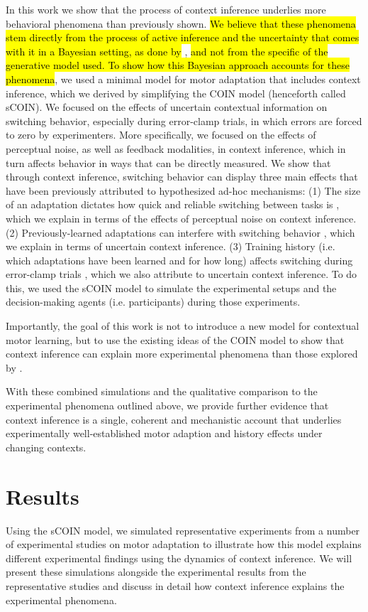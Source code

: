 \documentclass[a4paper,doc,floatsintext,natbib]{apa6}
\DeclareRobustCommand{\newcontent}[1]{\hl{#1}}
\begin{document}
In this work we show that the process of context inference underlies more behavioral phenomena than previously shown. \newcontent{We believe that these phenomena stem directly from the process of active inference and the uncertainty that comes with it in a Bayesian setting, as done by} \cite{Heald_Contextual_2021}, \newcontent{and not from the specific of the generative model used. To show how this Bayesian approach accounts for these phenomena}, we used a minimal model for motor adaptation that includes context inference, which we derived by simplifying the COIN model (henceforth called sCOIN). We focused on the effects of uncertain contextual information on switching behavior, especially during error-clamp trials, in which errors are forced to zero by experimenters. More specifically, we focused on the effects of perceptual noise, as well as feedback modalities, in context inference, which in turn affects behavior in ways that can be directly measured. We show that through context inference, switching behavior can display three main effects that have been previously attributed to hypothesized ad-hoc mechanisms: (1) The size of an adaptation dictates how quick and reliable switching between tasks is \citep{Oh_Minimizing_2019,Kim_Neural_2015}, which we explain in terms of the effects of perceptual noise on context inference. (2) Previously-learned adaptations can interfere with switching behavior \citep{Davidson_Scaling_2004}, which we explain in terms of uncertain context inference. (3) Training history (i.e. which adaptations have been learned and for how long) affects switching during error-clamp trials \citep{Vaswani_Decay_2013}, which we also attribute to uncertain context inference. To do this, we used the sCOIN model to simulate the experimental setups and the decision-making agents (i.e. participants) during those experiments.

Importantly, the goal of this work is not to introduce a new model for contextual motor learning, but to use the existing ideas of the COIN model to show that context inference can explain more experimental phenomena than those explored by \cite{Heald_Contextual_2021}.

With these combined simulations and the qualitative comparison to the experimental phenomena outlined above, we provide further evidence that context inference is a single, coherent and mechanistic account that underlies experimentally well-established motor adaption and history effects under changing contexts.

\section{Results}
Using the sCOIN model, we simulated representative experiments from a number of experimental studies on motor adaptation to illustrate how this model explains different experimental findings using the dynamics of context inference. We will present these simulations alongside the experimental results from the representative studies and discuss in detail how context inference explains the experimental phenomena.
\end{document}
